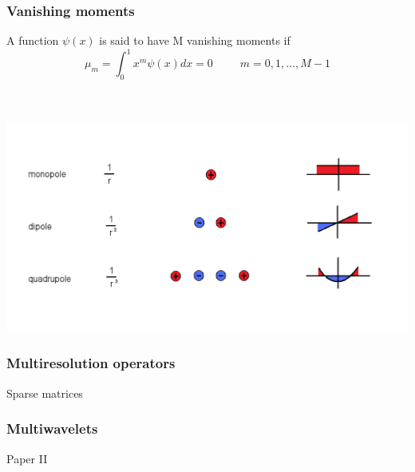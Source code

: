 \documentclass[mathserif]{beamer}
\begin{document}
\begin{frame}
    \frametitle{Vanishing moments}
    A function $\psi(x)$ is said to have M vanishing moments if
    \begin{equation}
	\nonumber
        \mu_m = \int_0^1 x^m\psi(x) dx = 0 \ \ \ \ \ \ \ \ \ \ \ m = 0,1,\dots,M-1 
    \end{equation}
    \ \\
    \ \\
    \begin{center}
	\includegraphics[scale=0.4, clip, viewport = 0 50 700 350]{figures/multipoles.pdf}
    \end{center}
\end{frame}

\begin{frame}
    \frametitle{Multiresolution operators}
    Sparse matrices
\end{frame}

\begin{frame}
    \frametitle{Multiwavelets}
    Paper II
\end{frame}
\end{document}
